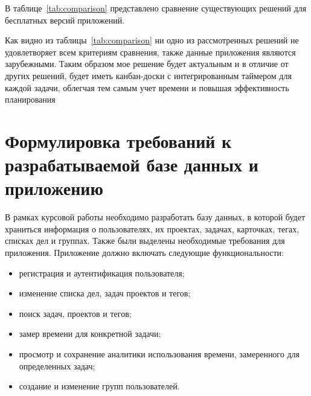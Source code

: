 В таблице~\ref{tab:comparison} представлено сравнение существующих решений для бесплатных версий приложений.

\begin{table}[H]
	\centering
	\caption{Сравнение существующих решений}
	\label{tab:comparison}
\end{table}


Как видно из таблицы~\ref{tab:comparison} ни одно из рассмотренных решений не удовлетворяет всем критериям сравнения, также данные приложения являются зарубежными.
Таким образом мое решение будет актуальным и в отличие от других решений, будет иметь канбан-доски с интегрированным таймером для каждой задачи, облегчая тем самым учет времени и повышая эффективность планирования


\section {Формулировка требований к разрабатываемой базе данных и приложению}

В рамках курсовой работы необходимо разработать базу данных, в которой будет храниться информация о пользователях, их проектах, задачах, карточках, тегах, списках дел и группах.
Также были выделены необходимые требования для приложения.
Приложение должно включать следующие функциональности:
\begin{itemize}
	\item регистрация и аутентификация пользователя;
	\item изменение списка дел, задач проектов и тегов;
	\item поиск задач, проектов и тегов;
	\item замер времени для конкретной задачи;
	\item просмотр и сохранение аналитики использования времени, замеренного для определенных задач;
	\item создание и изменение групп пользователей.
\end{itemize}

